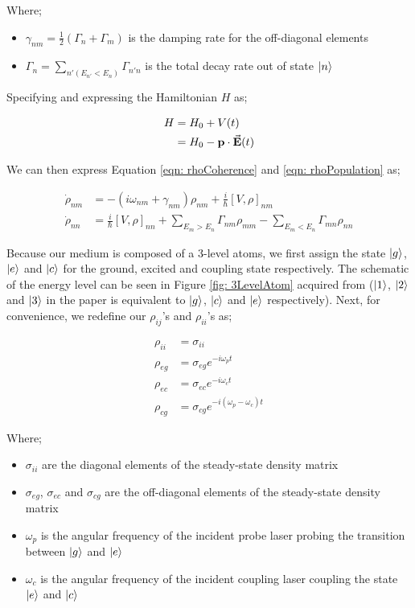Where;

\begin{itemize}
    \item $\gamma_{nm} = \frac{1}{2} (\Gamma_{n} + \Gamma_{m})$ is the damping rate for the off-diagonal elements
    \item $\Gamma_{n} = \sum_{n'(E_{n'} < E_{n})} \Gamma_{n'n}$ is the total decay rate out of state $\ket{n}$
\end{itemize}

Specifying and expressing the Hamiltonian $H$ as;

\begin{align}
    H &= H_{0} + V(t)\\
            &= H_{0} - \vb{p} \cdot \va{E}(t)
\end{align}

We can then express Equation \ref{eqn: rhoCoherence} and \ref{eqn: rhoPopulation} as;

\begin{align}
    \Dot{\rho}_{nm} &= -(i\omega_{nm} + \gamma_{nm}) \rho_{nm} + \frac{i}{\hbar} [V, \rho]_{nm} \label{eqn: rhoCohNew}\\
    \Dot{\rho}_{nn} &= \frac{i}{\hbar} [V, \rho]_{nn} + \sum_{E_{m} > E_{n}} \Gamma_{nm}\rho_{mm} - \sum_{E_{m} < E_{n}} \Gamma_{mn} \rho_{nn} \label{eqn: rhoPopNew}
\end{align}

Because our medium is composed of a 3-level atoms, we first assign the state $\ket{g}$, $\ket{e}$ and $\ket{c}$ for the ground, excited and coupling state respectively. The schematic of the energy level can be seen in Figure \ref{fig: 3LevelAtom} acquired from  ($\ket{1}$, $\ket{2}$ and $\ket{3}$ in the paper is equivalent to $\ket{g}$, $\ket{c}$ and $\ket{e}$ respectively). Next, for convenience, we redefine our $\rho_{ij}$'s and $\rho_{ii}$'s as;

\begin{align}
    \rho_{ii} &= \sigma_{ii} \label{eqn: rhoFirst}\\
    \rho_{eg} &= \sigma_{eg} e^{-i \omega_{p} t}\\
    \rho_{ec} &= \sigma_{ec} e^{-i \omega_{c} t}\\
    \rho_{cg} &= \sigma_{cg} e^{-i (\omega_{p} - \omega_{c}) t} \label{eqn: rhoLast}
\end{align}

Where;

\begin{itemize}
    \item $\sigma_{ii}$ are the diagonal elements of the steady-state  density matrix
    \item $\sigma_{eg}$, $\sigma_{ec}$ and $\sigma_{cg}$ are the off-diagonal elements of the steady-state density matrix 
    \item $\omega_{p}$ is the angular frequency of the incident probe laser probing the transition between $\ket{g}$ and $\ket{e}$
    \item $\omega_{c}$ is the angular frequency of the incident coupling laser coupling the state $\ket{e}$ and $\ket{c}$
\end{itemize}

